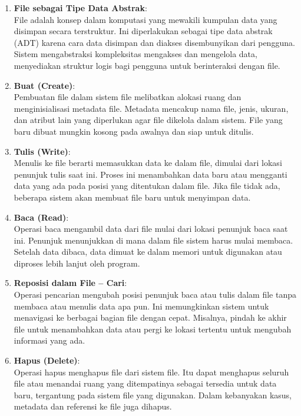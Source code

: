 \documentclass[12pt]{article}
\begin{document}
\begin{enumerate}
    \item \textbf{File sebagai Tipe Data Abstrak}: \\
    File adalah konsep dalam komputasi yang mewakili kumpulan data yang disimpan secara terstruktur. Ini diperlakukan sebagai tipe data abstrak (ADT) karena cara data disimpan dan diakses disembunyikan dari pengguna. Sistem mengabstraksi kompleksitas mengakses dan mengelola data, menyediakan struktur logis bagi pengguna untuk berinteraksi dengan file.
    
    \item \textbf{Buat (Create)}: \\
    Pembuatan file dalam sistem file melibatkan alokasi ruang dan menginisialisasi metadata file. Metadata mencakup nama file, jenis, ukuran, dan atribut lain yang diperlukan agar file dikelola dalam sistem. File yang baru dibuat mungkin kosong pada awalnya dan siap untuk ditulis.
    
    \item \textbf{Tulis (Write)}: \\
    Menulis ke file berarti memasukkan data ke dalam file, dimulai dari lokasi penunjuk tulis saat ini. Proses ini menambahkan data baru atau mengganti data yang ada pada posisi yang ditentukan dalam file. Jika file tidak ada, beberapa sistem akan membuat file baru untuk menyimpan data.
    
    \item \textbf{Baca (Read)}: \\
    Operasi baca mengambil data dari file mulai dari lokasi penunjuk baca saat ini. Penunjuk menunjukkan di mana dalam file sistem harus mulai membaca. Setelah data dibaca, data dimuat ke dalam memori untuk digunakan atau diproses lebih lanjut oleh program.
    
    \item \textbf{Reposisi dalam File -- Cari}: \\
    Operasi pencarian mengubah posisi penunjuk baca atau tulis dalam file tanpa membaca atau menulis data apa pun. Ini memungkinkan sistem untuk menavigasi ke berbagai bagian file dengan cepat. Misalnya, pindah ke akhir file untuk menambahkan data atau pergi ke lokasi tertentu untuk mengubah informasi yang ada.
    
    \item \textbf{Hapus (Delete)}: \\
    Operasi hapus menghapus file dari sistem file. Itu dapat menghapus seluruh file atau menandai ruang yang ditempatinya sebagai tersedia untuk data baru, tergantung pada sistem file yang digunakan. Dalam kebanyakan kasus, metadata dan referensi ke file juga dihapus.
    

\end{enumerate}
\end{document}
